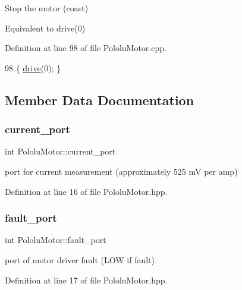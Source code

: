Stop the motor (coast) 

Equivalent to drive(0) 

Definition at line 98 of file Pololu\+Motor.\+cpp.


\begin{DoxyCode}
98 \{ \hyperlink{class_pololu_motor_abcece838332aaf501b6ae63fa371422e}{drive}(0); \}
\end{DoxyCode}


\subsection{Member Data Documentation}
\mbox{\label{class_pololu_motor_a6b58fc42cb55c835b966f20092aee79b}} 
\subsubsection{\texorpdfstring{current\+\_\+port}{current\_port}}
{\footnotesize\ttfamily int Pololu\+Motor\+::current\+\_\+port\hspace{0.3cm}{\ttfamily [private]}}



port for current measurement (approximately 525 mV per amp) 



Definition at line 16 of file Pololu\+Motor.\+hpp.

\mbox{\label{class_pololu_motor_aa1c771561c7c483216aec3415aa6ec9d}} 
\subsubsection{\texorpdfstring{fault\+\_\+port}{fault\_port}}
{\footnotesize\ttfamily int Pololu\+Motor\+::fault\+\_\+port\hspace{0.3cm}{\ttfamily [private]}}



port of motor driver fault (L\+OW if fault) 



Definition at line 17 of file Pololu\+Motor.\+hpp.

\mbox{\label{class_pololu_motor_a0685d77c55b5ff024ca26b959e26285f}} 
